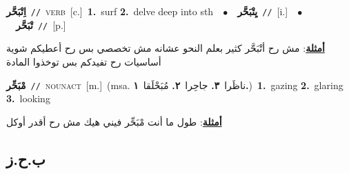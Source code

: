 \documentclass[10pt,a4paper,twoside]{article} %
\begin{document}
\begin{multicols}{2}
{{{{{{{{{{{\setlength\topsep{0pt}\textbf{\foreignlanguage{arabic}{اِتْبَحَّر}}\ {\color{gray}\texttt{//}\color{black}}\ \textsc{verb}\ [c.]\ \textbf{1.}~surf  \textbf{2.}~delve deep into sth\ \ $\bullet$\ \ \setlength\topsep{0pt}\textbf{\foreignlanguage{arabic}{يِتْبَحَّر}}\ {\color{gray}\texttt{//}\color{black}}\ [i.]\ \ $\bullet$\ \ \setlength\topsep{0pt}\textbf{\foreignlanguage{arabic}{تْبَحَّر}}\ {\color{gray}\texttt{//}\color{black}}\ [p.]\  \begin{flushright}\color{gray}\foreignlanguage{arabic}{\textbf{\underline{\foreignlanguage{arabic}{أمثلة}}}: مش رح أتْبَحَّر كثير بعلم النحو عشانه مش تخصصي بس رح أعطيكم شوية أساسيات رح تفيدكم بس توخذوا المادة}\end{flushright}\color{black}} \vspace{2mm}

{\setlength\topsep{0pt}\textbf{\foreignlanguage{arabic}{مْبَحِّر}}\ {\color{gray}\texttt{//}\color{black}}\ \textsc{noun\textunderscore act}\ [m.]\ \color{gray}(msa. \foreignlanguage{arabic}{ناظَرا}~\foreignlanguage{arabic}{\textbf{٣.}}  \foreignlanguage{arabic}{جاحِرا}~\foreignlanguage{arabic}{\textbf{٢.}}  \foreignlanguage{arabic}{مُبَحْلَقا}~\foreignlanguage{arabic}{\textbf{١.}})\color{black}\ \textbf{1.}~gazing  \textbf{2.}~glaring  \textbf{3.}~looking\  \begin{flushright}\color{gray}\foreignlanguage{arabic}{\textbf{\underline{\foreignlanguage{arabic}{أمثلة}}}: طول ما أنت مْبَحِّر فيني هيك مش رح أقدر أوكل}\end{flushright}\color{black}} \vspace{2mm}

\vspace{-3mm}
\subsection*{\color{blue}\foreignlanguage{arabic}{ب.ح.ز}\color{blue}{}} 

}}}}}}}}}}
\end{multicols}
\end{document}
